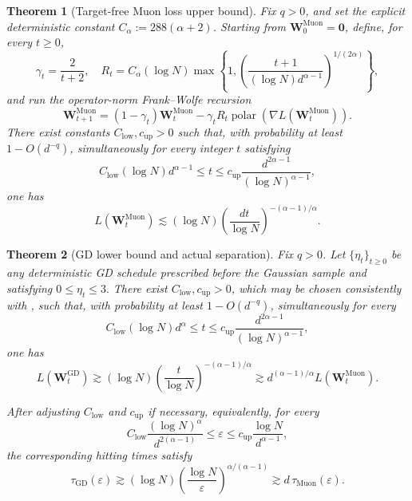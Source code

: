 \documentclass[11pt]{article}
\newtheorem{theorem}{Theorem}[section]
\theoremstyle{definition}
\newcommand{\Wb}{\mathbf{W}}
\newcommand{\eps}{\varepsilon}
\DeclareMathOperator{\polar}{polar}
\begin{document}
\begin{theorem}[Target-free Muon loss upper bound]
\label{thm:Muon-upper bound}
Fix $q>0$, and set the explicit deterministic constant $C_\alpha:=288(\alpha+2)$.  Starting from $\Wb_0^{\mathrm{Muon}}=\mathbf 0$, define, for every $t\geq0$,
\[
\gamma_t=\frac{2}{t+2},
\quad R_t=C_\alpha(\log N)\max\left\{1,\left(
\frac{t+1}{(\log N)d^{\alpha-1}}
\right)^{1/(2\alpha)}
\right\},
\]
and run the operator-norm Frank--Wolfe recursion
\[
\Wb_{t+1}^{\mathrm{Muon}}=
(1-\gamma_t)\Wb_t^{\mathrm{Muon}}
-\gamma_tR_t
\polar\!\left(\nabla L(\Wb_t^{\mathrm{Muon}})\right).
\]
There exist constants $C_{\mathrm{low}},c_{\mathrm{up}}>0$ such that,
with probability at least $1-O(d^{-q})$, simultaneously for every integer
$t$ satisfying
\[
C_{\mathrm{low}}(\log N)d^{\alpha-1}
\leq t
\leq
c_{\mathrm{up}}
\frac{d^{2\alpha-1}}{(\log N)^{\alpha-1}},
\]
one has
\[
L(\Wb_t^{\mathrm{Muon}})
\lesssim
(\log N)
\left(
\frac{dt}{\log N}
\right)^{-(\alpha-1)/\alpha}.
\]
\end{theorem}

\begin{theorem}[GD lower bound and actual separation]
\label{thm:gd}
Fix $q>0$.  Let $\{\eta_t\}_{t\geq0}$ be any deterministic GD schedule prescribed before the Gaussian sample and satisfying $0\leq \eta_t\leq 3.$ There exist $C_{\mathrm{low}},c_{\mathrm{up}}>0$, which may be chosen consistently with , such that, with probability at least $1-O(d^{-q})$, simultaneously for every
\[
C_{\mathrm{low}}(\log N)d^\alpha
\leq t
\leq
c_{\mathrm{up}}
\frac{d^{2\alpha-1}}{(\log N)^{\alpha-1}},
\]
one has
\[
L(\Wb_t^{\mathrm{GD}})\gtrsim(\log N)\left(\frac{t}{\log N}\right)^{-(\alpha-1)/\alpha}\gtrsim
d^{(\alpha-1)/\alpha}
L(\Wb_t^{\mathrm{Muon}}).
\]

After adjusting $C_{\mathrm{low}}$ and $c_{\mathrm{up}}$ if necessary,
equivalently, for every
\[
C_{\mathrm{low}}
\frac{(\log N)^\alpha}{d^{2(\alpha-1)}}
\le \eps\le
c_{\mathrm{up}}
\frac{\log N}{d^{\alpha-1}},
\]
the corresponding hitting times satisfy
\[
\tau_{\mathrm{GD}}(\eps)
\gtrsim
(\log N)
\left(\frac{\log N}{\eps}\right)^{\alpha/(\alpha-1)}
\gtrsim
d\,\tau_{\mathrm{Muon}}(\eps).
\]
\end{theorem}
\end{document}
